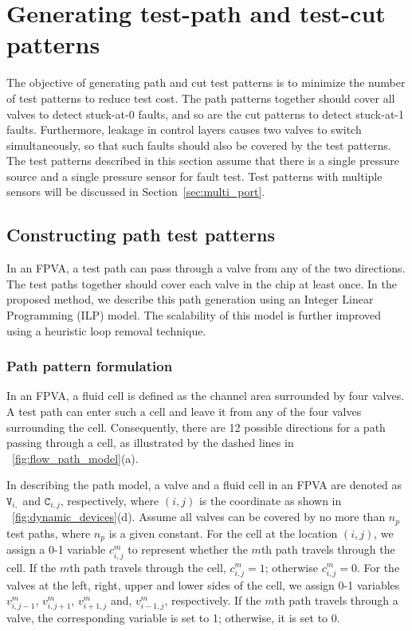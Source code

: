 \documentclass[journal,twoside]{IEEEtran}
\begin{document}
\section{Generating test-path and test-cut patterns} 
\label{sec:path_cut}

The objective of generating path and cut test patterns is
to minimize the number of test patterns to reduce test cost. The path patterns
together should cover all valves to detect stuck-at-0 faults, and so  
are the cut patterns to detect stuck-at-1 faults. Furthermore, leakage in
control layers causes two valves to switch simultaneously, so that such faults
should also be covered by the test patterns. The test patterns described in
this section assume that there is a single pressure source and a single
pressure sensor for fault test. Test patterns with multiple sensors will be discussed in
Section~\ref{sec:multi_port}.


\subsection{Constructing path test patterns} 
\label{sec:flow_paths}

In an FPVA, a test path can pass through a valve from any of the two
directions.  
The test paths together should cover each valve in the chip at least once.
In the proposed method, we describe this path generation using an Integer Linear
Programming (ILP) model.  The scalability of this model is further improved
using a heuristic loop removal technique. 

\subsubsection{Path pattern formulation} \label{sec:flow_path_cons}

In an FPVA, a fluid cell is defined as the channel area surrounded by four
valves. A test path can enter such a   
cell and leave it from any of the four valves surrounding the cell.
Consequently,  
there are 12 possible directions for a path passing through a cell, 
as illustrated by the dashed lines in \figname~\ref{fig:flow_path_model}(a).

In describing the path model, a valve
and a fluid cell in an FPVA are denoted as $\mathtt{V}_{i,}$ and
$\mathtt{C}_{i,j}$, respectively, where $(i,j)$ is the coordinate as shown in
\figname~\ref{fig:dynamic_devices}(d).
Assume all valves can be covered by 
no more than $n_p$ test paths, 
where $n_p$ is a given constant. 
For the cell at the location $(i,j)$, we assign
a 0-1 variable $c^m_{i,j}$ to represent whether the $m$th path travels through
the cell. If the $m$th path travels through the cell,
$c^m_{i,j}=1$; otherwise $c^m_{i,j}=0$.
For the valves at the left, right, upper and lower sides of the cell, 
we assign 0-1 variables 
$v_{i, j-1}^m$, $v_{i, j+1}^m$, $v_{i+1, j}^m$ and, $v_{i-1, j}^m$, respectively. If 
the $m$th path travels through a valve, the corresponding variable is set to 1;
otherwise, it is set to 0.  
\end{document}
